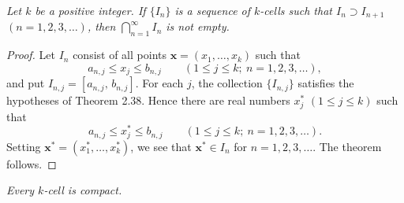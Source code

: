 \emph{Let $k$ be a positive integer. If $\{I_n\}$ is a sequence of $k$-cells
such that $I_n \supset I_{n+1}$ $(n = 1,2,3,\dots)$, then
$\bigcap_{n=1}^\infty I_n$ is not empty.}

\begin{proof}
Let $I_n$ consist of all points $\mathbf{x} = (x_1,\dots,x_k)$ such that
\[ a_{n,j} \le x_j \le b_{n,j} \qquad (1 \le j \le k;\ n = 1,2,3,\dots), \]
and put $I_{n,j} = [a_{n,j},\,b_{n,j}]$. For each $j$, the collection
$\{I_{n,j}\}$ satisfies the hypotheses of Theorem 2.38. Hence there are real
numbers $x_j^*$ $(1 \le j \le k)$ such that
\[ a_{n,j} \le x_j^* \le b_{n,j} \qquad (1 \le j \le k;\ n = 1,2,3,\dots). \]
Setting $\mathbf{x}^* = (x_1^*,\dots,x_k^*)$, we see that
$\mathbf{x}^* \in I_n$ for $n = 1,2,3,\dots$. The theorem follows.
\end{proof}

\emph{Every $k$-cell is compact.}

